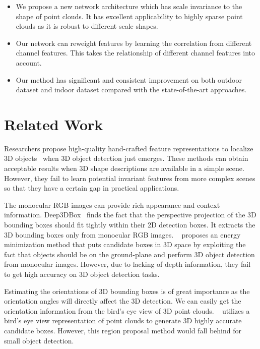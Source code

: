 \documentclass[letterpaper]{article} %
\begin{document}
\begin{itemize}
\item We propose a new network architecture which has scale invariance to the shape of point clouds. It has excellent applicability to highly sparse point clouds as it is robust to different scale shapes.
\item Our network can reweight features by learning the correlation from different channel features. This takes the relationship of different channel features into account.
\item Our method has significant and consistent improvement on both outdoor dataset and indoor dataset compared with the state-of-the-art approaches.
\end{itemize}


\section{Related Work}
Researchers propose high-quality hand-crafted feature representations to localize 3D objects~\cite{dorai1997cosmos,johnson1999using,rusu2009fast} when 3D object detection just emerges. These methods can obtain acceptable results when 3D shape descriptions are available in a simple scene. However, they fail to learn potential invariant features from  more complex scenes so that they have a certain gap in practical applications.

The monocular RGB images can provide rich appearance and context information. Deep3DBox~\cite{mousavian20173d} finds the fact that the perspective projection of the 3D bounding boxes should fit tightly within their 2D detection boxes. It extracts the 3D bounding boxes only from monocular RGB images. ~\cite{chen2016monocular} proposes an energy minimization method that puts candidate boxes in 3D space by exploiting the fact that objects should be on the ground-plane and perform 3D object detection from monocular images. However, due to lacking of depth information, they fail to get high accuracy on 3D object detection tasks.

Estimating the orientations of 3D bounding boxes is of great importance as the orientation angles will directly affect the 3D detection. We can easily get the orientation information from the bird's eye view of 3D point clouds. ~\cite{chen2017multi} utilizes a bird's eye view representation of point clouds to generate 3D highly accurate candidate boxes. However, this region proposal method would fall behind for small object detection.
\end{document}
